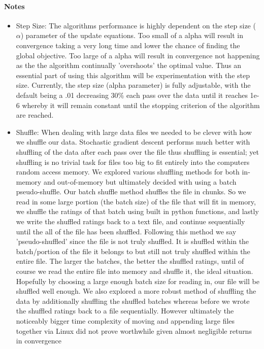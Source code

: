 \documentclass[12pt]{article}
\begin{document}
\paragraph{Notes}
\begin{itemize}
            
	\item Step Size: The algorithms performance is highly dependent on the step size ($\alpha$) parameter of the update equations. Too small of a alpha will result in convergence taking a very long time and lower the chance of finding the global objective. Too large of a alpha will result in convergence not happening as the the algorithm continually 'overshoots' the optimal value. Thus an essential part of using this algorithm will be experimentation with the step size. Currently, the step size (alpha parameter) is fully adjustable, with the default being a .01 decreasing 30\% each pass over the data until it reaches 1e-6 whereby it will remain constant until the stopping criterion of the algorithm are reached.
	
	\item Shuffle: When dealing with large data files we needed to be clever with how we shuffle our data. Stochastic gradient descent performs much better with shuffling of the data after each pass over the file thus shuffling is essential; yet shuffling is no trivial task for files too big to fit entirely into the computers random access memory. We explored various shuffling methods for both in-memory and out-of-memory but ultimately decided with using a batch pseudo-shuffle. Our batch shuffle method shuffles the file in chunks. So we read in some large portion (the batch size) of the file that will fit in memory, we shuffle the ratings of that batch using built in python functions, and lastly we write the shuffled ratings back to a text file, and continue sequentially until the all of the file has been shuffled. Following this method we say 'pseudo-shuffled' since the file is not truly shuffled. It is shuffled within the batch/portion of the file it belongs to but still not truly shuffled within the entire file. The larger the batches, the better the shuffled ratings, until of course we read the entire file into memory and shuffle it, the ideal situation. Hopefully by choosing a large enough batch size for reading in, our file will be shuffled well enough. We also explored a more robust method of shuffling the data by additionally shuffling the shuffled batches whereas before we wrote the shuffled ratings back to a file sequentially.  However ultimately the noticeably bigger time complexity of moving and appending large files together via Linux did not prove worthwhile given almost negligible returns in convergence

\end{itemize}
\end{document}
